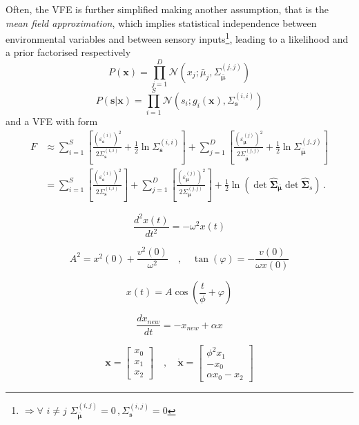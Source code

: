 \documentclass[a4paper, 10pt]{article}
\begin{document}
Often, the VFE is further simplified making another assumption, that is the \emph{mean field approximation}, which implies statistical independence between environmental variables and between sensory inputs\footnote{$\Rightarrow \forall \, \, i \neq j \, \, \Sigma_{\bar{\bm \mu}}^{(i,j)}=0 \, , \Sigma_{\mathbf s}^{(i,j)}=0 $}, leading to a likelihood and a prior factorised respectively 
\begin{equation}
P(\mathbf x) = \prod_{j=1}^{D} \mathcal{N}(x_{j}; \bar{\mu}_{j}, \Sigma_{\bar{\bm \mu}}^{(j,j)})
\end{equation}
\begin{equation}
P(\mathbf s | \mathbf x) = \prod_{i=1}^{S} \mathcal{N}(s_{i}; g_{i}(\mathbf x), \Sigma_{\mathbf s}^{(i,i)})
\end{equation}
and a VFE with form
\begin{equation}
\begin{split}
F &\approx \sum_{i=1}^S \left[ \frac{(\varepsilon_{\mathbf s}^{(i)})^2}{2 \Sigma_{\mathbf s}^{(i,i)}} + \frac{1}{2} \ln \Sigma_{\mathbf s}^{(i,i)}  \right] + \sum_{j=1}^D \left[ \frac{(\varepsilon_{\bm \mu}^{(j)})^2}{2 \Sigma_{\bar{\bm \mu}}^{(j,j)}} + \frac{1}{2} \ln \Sigma_{\bar{\bm \mu}}^{(j,j)}  \right] \\
	&= \sum_{i=1}^S \left[ \frac{(\varepsilon_{\mathbf s}^{(i)})^2}{2 \Sigma_{\mathbf s}^{(i,i)}} \right] + \sum_{j=1}^D \left[ \frac{(\varepsilon_{\bm \mu}^{(j)})^2}{2 \Sigma_{\bm \mu}^{(j,j)}} \right] + \frac{1}{2} \ln \left( \det \bm{\hat{\Sigma}}_{\bar{\bm \mu}} \det \bm{\hat{\Sigma}}_{s} \right) \, .
\end{split}
\end{equation}


\newpage
\begin{equation}
\frac{d^2 x(t)}{dt^2} = - \omega^2 x(t)
\end{equation}


\begin{equation}
A^2=x^2(0)+\frac{v^2(0)}{\omega^2} \quad , \quad \tan (\varphi) = - \frac{v(0)}{\omega x(0)}
\end{equation}


\begin{equation}
x(t) = A \cos(\frac{t}{\phi} + \varphi)
\end{equation}

\begin{equation}
\frac{ d x_{new} }{ dt } = -x_{new} + \alpha x
\end{equation}

\begin{equation}
\mathbf x = \left[\begin{array}{c} x_0 \\ x_1 \\ x_2 \end{array}\right] 
	\quad , \quad \mathbf{\dot{x}} = \left[\begin{array}{c}
    \phi^2 x_1 \\
    -x_0 \\
    \alpha x_0 - x_2
    \end{array}\right] 
\end{equation}
\end{document}
